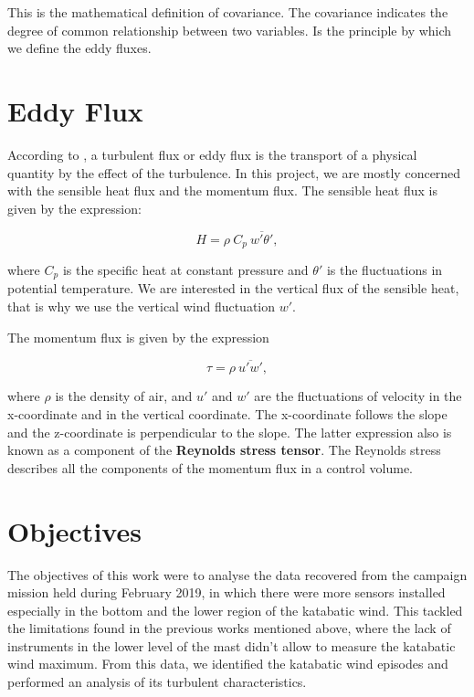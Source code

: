 \noindent This is the mathematical definition of covariance. The covariance indicates the degree of common relationship between two variables. Is the principle by which we define the eddy fluxes.

\section{Eddy Flux}
According to \cite{stull2012introduction}, a turbulent flux or eddy flux is the transport of a physical quantity by the effect of the turbulence. In this project, we are mostly concerned with the sensible heat flux and the momentum flux. The sensible heat flux is given by the expression:

\begin{equation}
    H = \rho \ C_p \ \overline{w'\theta'},
\end{equation}

\noindent where $C_p$ is the specific heat at constant pressure and $\theta '$ is the fluctuations in potential temperature. We are interested in the vertical flux of the sensible heat, that is why we use the vertical wind fluctuation $w'$.

The momentum flux is given by the expression

\begin{equation}
    \tau = \rho \ \overline{u'w'}, 
\end{equation}

\noindent where $\rho$ is the density of air, and $u'$ and $w'$ are the fluctuations of velocity in the x-coordinate and in the vertical coordinate. The x-coordinate follows the slope and the z-coordinate is perpendicular to the slope. The latter expression also is known as a component of the \textbf{Reynolds stress tensor}. The Reynolds stress describes all the components of the momentum flux in a control volume.

\section{Objectives}

The objectives of this work were to analyse the data recovered from the campaign mission held during February 2019, in which there were more sensors installed especially in the bottom and the lower region of the katabatic wind. This tackled the limitations found in the previous works mentioned above, where the lack of instruments in the lower level of the mast didn't allow to measure the katabatic wind maximum. From this data, we identified the katabatic wind episodes and performed an analysis of its turbulent characteristics.
